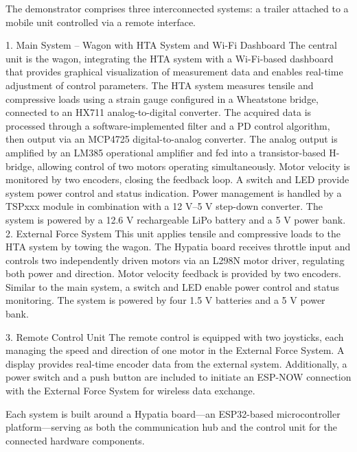 The demonstrator comprises three interconnected systems: a trailer attached to a mobile unit controlled via a remote interface.

1. Main System – Wagon with HTA System and Wi-Fi Dashboard
The central unit is the wagon, integrating the HTA system with a Wi-Fi-based dashboard that provides graphical visualization of measurement data and enables real-time adjustment of control parameters.
The HTA system measures tensile and compressive loads using a strain gauge configured in a Wheatstone bridge, connected to an HX711 analog-to-digital converter. The acquired data is processed through a software-implemented filter and a PD control algorithm, then output via an MCP4725 digital-to-analog converter.
The analog output is amplified by an LM385 operational amplifier and fed into a transistor-based H-bridge, allowing control of two motors operating simultaneously. Motor velocity is monitored by two encoders, closing the feedback loop. A switch and LED provide system power control and status indication.
Power management is handled by a TSPxxx module in combination with a 12 V–5 V step-down converter. The system is powered by a 12.6 V rechargeable LiPo battery and a 5 V power bank.
2. External Force System
This unit applies tensile and compressive loads to the HTA system by towing the wagon. The Hypatia board receives throttle input and controls two independently driven motors via an L298N motor driver, regulating both power and direction. Motor velocity feedback is provided by two encoders. Similar to the main system, a switch and LED enable power control and status monitoring. The system is powered by four 1.5 V batteries and a 5 V power bank.

3. Remote Control Unit
The remote control is equipped with two joysticks, each managing the speed and direction of one motor in the External Force System. A display provides real-time encoder data from the external system. Additionally, a power switch and a push button are included to initiate an ESP-NOW connection with the External Force System for wireless data exchange.

Each system is built around a Hypatia board—an ESP32-based microcontroller platform—serving as both the communication hub and the control unit for the connected hardware components.